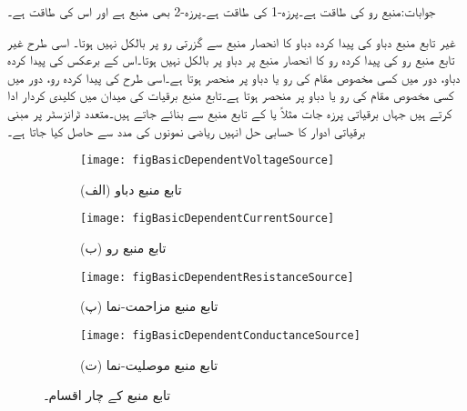 جوابات:منبع رو کی طاقت  ہے۔پرزہ-1 کی طاقت  ہے۔پرزہ-2 بھی منبع ہے اور اس کی طاقت  ہے۔

غیر تابع منبع دباو کی پیدا کردہ دباو کا انحصار منبع سے گزرتی رو پر بالکل نہیں ہوتا۔ اسی طرح غیر تابع منبع رو کی پیدا کردہ رو کا انحصار منبع پر دباو پر بالکل نہیں ہوتا۔اس کے برعکس  کی پیدا کردہ دباو،  دور میں کسی مخصوص مقام کی رو یا دباو پر منحصر ہوتا ہے۔اسی طرح  کی پیدا کردہ رو،  دور میں کسی مخصوص مقام کی رو یا دباو پر منحصر ہوتا ہے۔تابع منبع برقیات کی میدان میں کلیدی کردار ادا کرتے ہیں جہاں برقیاتی پرزہ جات مثلاً  یا  کے   تابع منبع سے بنائے جاتے ہیں۔متعدد ٹرانزسٹر پر مبنی برقیاتی ادوار کا حسابی حل انہیں ریاضی نمونوں کی مدد سے حاصل کیا جاتا ہے۔

\begin{figure}
\centering
\begin{subfigure}{0.5\textwidth}
\centering
\texttt{[image: figBasicDependentVoltageSource]}
\caption*{(الف) تابع منبع دباو}
\end{subfigure}%
\begin{subfigure}{0.5\textwidth}
\centering
\texttt{[image: figBasicDependentCurrentSource]}
\caption*{(ب) تابع منبع رو}
\end{subfigure}
%
\begin{subfigure}{0.5\textwidth}
\centering
\texttt{[image: figBasicDependentResistanceSource]}
\caption*{(پ) تابع منبع مزاحمت-نما}
\end{subfigure}%
\begin{subfigure}{0.5\textwidth}
\centering
\texttt{[image: figBasicDependentConductanceSource]}
\caption*{(ت) تابع منبع موصلیت-نما}
\end{subfigure}%
\caption{تابع منبع کے چار اقسام۔}
\label{شکل_بنیادی_تابع_منبع_اقسام}
\end{figure}


